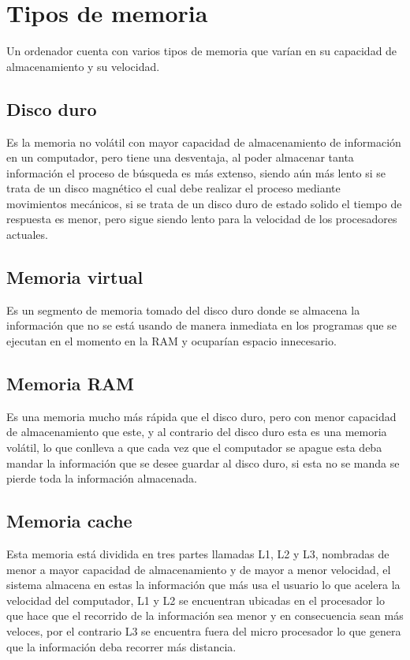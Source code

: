 \documentclass{article}
\begin{document}
\section{Tipos de memoria} \label{contenido}


Un ordenador cuenta con varios tipos de memoria que varían en su capacidad de almacenamiento
y su velocidad. 


\subsection{Disco duro }
Es la memoria no volátil con mayor capacidad de almacenamiento de información en un computador, pero tiene una desventaja, al poder almacenar tanta información el proceso de búsqueda es más extenso, siendo aún más lento si se trata de un disco magnético el cual debe realizar el proceso mediante movimientos mecánicos, si se trata de un disco duro de estado solido el tiempo de respuesta es menor, pero sigue siendo lento para la velocidad de los procesadores actuales. 

\subsection{Memoria virtual }

Es un segmento de memoria tomado del disco duro donde se almacena la información que no se está usando de manera inmediata en los programas que se ejecutan en el momento en la RAM y ocuparían espacio innecesario. 

\subsection{Memoria RAM }

Es una memoria mucho más rápida que el disco duro, pero con menor capacidad de almacenamiento que este, y al contrario del disco duro esta es una memoria volátil, lo que conlleva a que cada vez que el computador se apague esta deba mandar la información que se desee guardar al disco duro, si esta no se manda se pierde toda la información almacenada.   

\subsection{Memoria cache }

Esta memoria está dividida en tres partes llamadas L1, L2 y L3, nombradas de menor a mayor capacidad de almacenamiento y de mayor a menor velocidad, el sistema almacena en estas la información que más usa el usuario lo que acelera la velocidad del computador, L1 y L2 se encuentran ubicadas en el procesador lo que hace que el recorrido de la información sea menor  y en consecuencia sean más veloces, por el contrario L3 se encuentra fuera del micro procesador lo que genera que la información deba recorrer más distancia. 
\end{document}
